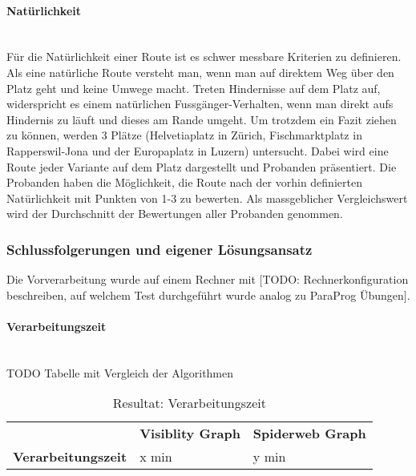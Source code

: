 \paragraph{Natürlichkeit}\label{criteria:Natürlichkeit}~\\
Für die Natürlichkeit einer Route ist es schwer messbare Kriterien zu definieren. Als eine natürliche Route versteht man, wenn man auf direktem Weg über den Platz geht und keine Umwege macht. Treten Hindernisse auf dem Platz auf, widerspricht es einem natürlichen Fussgänger-Verhalten, wenn man direkt aufs Hindernis zu läuft und dieses am Rande umgeht. Um trotzdem ein Fazit ziehen zu können, werden 3 Plätze (Helvetiaplatz in Zürich, Fischmarktplatz in Rapperswil-Jona und der Europaplatz in Luzern) untersucht. Dabei wird eine Route jeder Variante auf dem Platz dargestellt und Probanden präsentiert. Die Probanden haben die Möglichkeit, die Route nach der vorhin definierten Natürlichkeit mit Punkten von 1-3 zu bewerten. Als massgeblicher Vergleichswert wird der Durchschnitt der Bewertungen aller Probanden genommen.


\subsubsection{Schlussfolgerungen und eigener Lösungsansatz}
\label{sub:Schlussfolgerungen und eigener Lösungsansatz}
Die Vorverarbeitung wurde auf einem Rechner mit [TODO: Rechnerkonfiguration beschreiben, auf welchem Test durchgeführt wurde analog zu ParaProg Übungen]. 

\paragraph{Verarbeitungszeit}\label{result:Verarbeitungszeit}~\\
TODO Tabelle mit Vergleich der Algorithmen
\begin{table}[ht]
    \centering
    \caption{Resultat: Verarbeitungszeit}
    \label{Resultat: Verarbeitungszeit}
    \begin{tabular}{lll}
        & \textbf{Visiblity Graph} & \textbf{Spiderweb Graph} \\
        \textbf{Verarbeitungszeit} & x min                    & y min                   
    \end{tabular}
\end{table}


